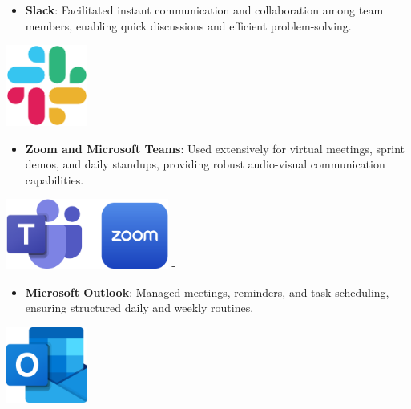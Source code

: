 \begin{itemize}
    \item \textbf{Slack}: Facilitated instant communication and collaboration among team members, enabling quick discussions and efficient problem-solving.
\end{itemize}

\begin{center}
    \centering
    \includegraphics[width=0.2\textwidth]{Images/Slack Logo.png}
     \cite{slack_logo}
    \label{fig:slack_logo}
\end{center}

\begin{itemize}
    \item \textbf{Zoom and Microsoft Teams}: Used extensively for virtual meetings, sprint demos, and daily standups, providing robust audio-visual communication capabilities.
\end{itemize}

\begin{center}
    \centering
    \includegraphics[width=0.4\textwidth]{Images/Zoom and Microsoft Teams Logos.png}
     \cite{zoom_logo} - \cite{microsoft_teams_logo}
    \label{fig:zoom_and_microsoft_teams_logos}
\end{center}

\begin{itemize}
    \item \textbf{Microsoft Outlook}: Managed meetings, reminders, and task scheduling, ensuring structured daily and weekly routines.
\end{itemize}

\begin{center}
    \centering
    \includegraphics[width=0.2\textwidth]{Images/Microsoft Outlook Logo.png}
     \cite{microsoft_outlook_logo}
    \label{fig:microsoft_outlook_logo}
\end{center}

